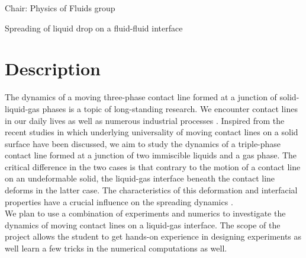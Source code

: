 \documentclass[a4paper,10pt]{article}
\begin{document}
\noindent Chair: Physics of Fluids group
\begin{center}
 \begin{LARGE}
  Spreading of liquid drop on a fluid-fluid interface
 \end{LARGE}
\end{center}

\section*{Description}
The dynamics of a moving three-phase contact line formed at a junction of solid-liquid-gas phases is a topic of long-standing research. We encounter contact lines in our daily lives as well as numerous industrial processes \citep{bonn2009wetting}. Inspired from the recent studies in which underlying universality of moving contact lines on a solid surface have been discussed, we aim to study the dynamics of a triple-phase contact line formed at a junction of two immiscible liquids and a gas phase. The critical difference in the two cases is that contrary to the motion of a contact line on an undeformable solid, the liquid-gas interface beneath the contact line deforms in the latter case. The characteristics of this deformation and interfacial properties have a crucial influence on the spreading dynamics \citep{rahman2018droplet}.\\
We plan to use a combination of experiments and numerics to investigate the dynamics of moving contact lines on a liquid-gas interface. The scope of the project allows the student to get hands-on experience in designing experiments as well learn a few tricks in the numerical computations as well.\\
\end{document}
